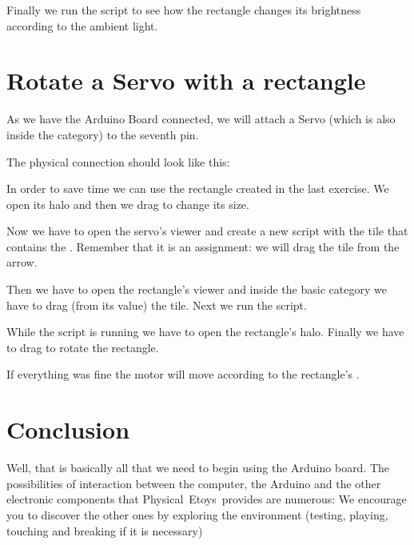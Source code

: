 \documentclass[english]{etoys-guide}
\def\appName{Physical~Etoys~}
\begin{document}

Finally we run the script to see how the rectangle changes its brightness
according to the ambient light. 

\section{Rotate a Servo with a rectangle}

As we have the Arduino Board connected, we will attach a Servo (which is
also inside the  category) to the seventh pin. 


The physical connection should look like this: 


In order to save time we can use the rectangle created in the last exercise. We
open its halo and then we drag  to change its size. 


Now we have to open the servo’s viewer and create a new script with the tile
that contains the . Remember that it is an assignment: we
will drag the tile from the  arrow. 


Then we have to open the rectangle’s viewer and inside the basic category we
have to drag (from its value) the  tile. Next we run the script. 


While the script is running we have to open the rectangle’s halo. Finally we
have to drag  to rotate the rectangle. 


If everything was fine the motor will move according to the rectangle’s
. 

\section{Conclusion}

Well, that is basically all that we need to begin using the Arduino board. The
possibilities of interaction between the computer, the Arduino and the other
electronic components that \appName provides are numerous: We encourage you to
discover the other ones by exploring the environment (testing, playing,
touching and breaking if it is necessary) 
\end{document}
